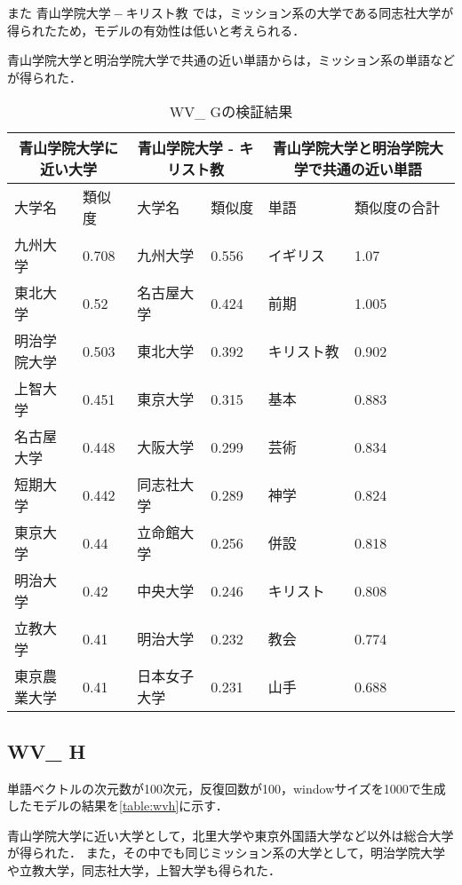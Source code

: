また $ 青山学院大学 - キリスト教 $ では，ミッション系の大学である同志社大学が得られたため，モデルの有効性は低いと考えられる．

青山学院大学と明治学院大学で共通の近い単語からは，ミッション系の単語などが得られた．
\begin{table}[H]
\caption{WV\_ Gの検証結果}
\centering
\footnotesize
\begin{tabular}{ll|ll|ll}
\hline
\multicolumn{2}{c}{青山学院大学に近い大学} & \multicolumn{2}{c}{青山学院大学 - キリスト教} & \multicolumn{2}{c}{青山学院大学と明治学院大学で共通の近い単語}
\\ \hline
大学名 & 類似度 & 大学名 & 類似度 & 単語 & 類似度の合計
\\ \hline \hline
九州大学 & 0.708 & 九州大学 & 0.556 & イギリス & 1.07\\
東北大学 & 0.52 & 名古屋大学 & 0.424 & 前期 & 1.005\\
明治学院大学 & 0.503 & 東北大学 & 0.392 & キリスト教 & 0.902\\
上智大学 & 0.451 & 東京大学 & 0.315 & 基本 & 0.883\\
名古屋大学 & 0.448 & 大阪大学 & 0.299 & 芸術 & 0.834\\
短期大学 & 0.442 & 同志社大学 & 0.289 & 神学 & 0.824\\
東京大学 & 0.44 & 立命館大学 & 0.256 & 併設 & 0.818\\
明治大学 & 0.42 & 中央大学 & 0.246 & キリスト & 0.808\\
立教大学 & 0.41 & 明治大学 & 0.232 & 教会 & 0.774\\
東京農業大学 & 0.41 & 日本女子大学 & 0.231 & 山手 & 0.688\\ \hline
\end{tabular}
\label{table:wvg}
\end{table}


\subsection{WV\_ H}
単語ベクトルの次元数が100次元，反復回数が100，windowサイズを1000で生成したモデルの結果を\ref{table:wvh}に示す．

青山学院大学に近い大学として，北里大学や東京外国語大学など以外は総合大学が得られた．
また，その中でも同じミッション系の大学として，明治学院大学や立教大学，同志社大学，上智大学も得られた．

